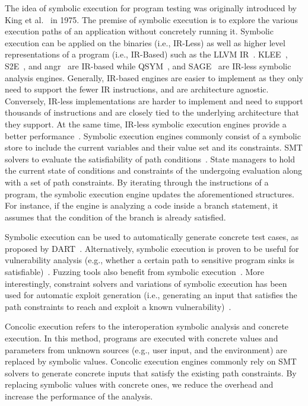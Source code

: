 The idea of symbolic execution for program testing was originally introduced by King et al.~\cite{king1976symbolic} in 1975. 
The premise of symbolic execution is to explore the various execution paths of an application without concretely running it. 
Symbolic execution can be applied on the binaries (i.e., IR-Less) as well as higher level representations of a program (i.e., IR-Based) such as the LLVM IR~\cite{llvmir}. 
KLEE~\cite{cadar2008klee}, S2E~\cite{chipounov2009selective}, and angr~\cite{cheng2016binary} are IR-based while QSYM~\cite{yun2018qsym}, and SAGE~\cite{godefroid2012sage} are IR-less symbolic analysis engines. 
Generally, IR-based engines are easier to implement as they only need to support the fewer IR instructions, and are architecture agnostic. 
Conversely, IR-less implementations are harder to implement and need to support thousands of instructions and are closely tied to the underlying architecture that they support. 
At the same time, IR-less symbolic execution engines provide a better performance~\cite{poeplau2019systematic}.
Symbolic execution engines commonly consist of a symbolic store to include the current variables and their value set and its constraints. 
SMT solvers to evaluate the satisfiability of path conditions~\cite{moura2008z3}. 
State managers to hold the current state of conditions and constraints of the undergoing evaluation along with a set of path constraints. 
By iterating through the instructions of a program, the symbolic execution engine updates the aforementioned structures. 
For instance, if the engine is analyzing a code inside a branch statement, it assumes that the condition of the branch is already satisfied. 

Symbolic execution can be used to automatically generate concrete test cases, as proposed by DART~\cite{sen2009dart, sen2005cute}. 
Alternatively, symbolic execution is proven to be useful for vulnerability analysis (e.g., whether a certain path to sensitive program sinks is satisfiable)~\cite{5504701, wang2009intscope, cha2012unleashing, cadar2008klee}. 
Fuzzing tools also benefit from symbolic execution~\cite{godefroid2012sage}.
More interestingly, constraint solvers and variations of symbolic execution has been used for automatic exploit generation (i.e., generating an input that satisfies the path constraints to reach and exploit a known vulnerability)~\cite{alhuzali2018navex, avgerinos2014automatic}.

Concolic execution refers to the interoperation symbolic analysis and concrete execution. 
In this method, programs are executed with concrete values and parameters from unknown sources (e.g., user input, and the environment) are replaced by symbolic values. 
Concolic execution engines commonly rely on SMT solvers to generate concrete inputs that satisfy the existing path constraints. 
By replacing symbolic values with concrete ones, we reduce the overhead and increase the performance of the analysis. 

